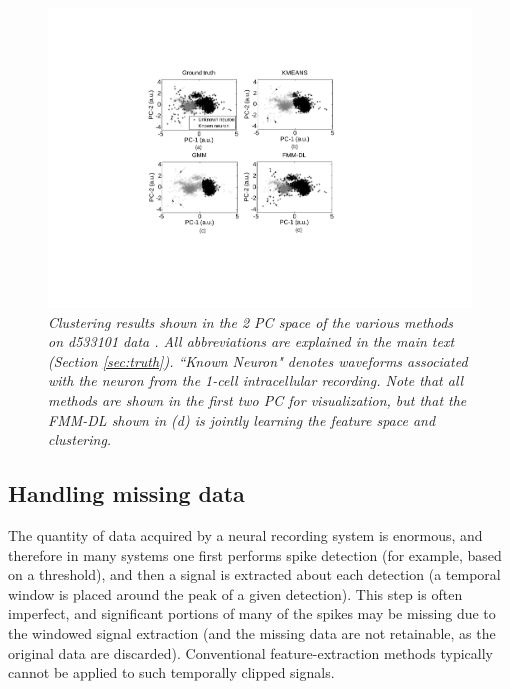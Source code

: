 \documentclass[journal]{IEEEtran}
\begin{document}
\begin{figure}[h!]
  \centering
    \includegraphics[width=1.0\linewidth]{figs_new/Dictionary_hc1.pdf}
    \caption{\textit{\small{ Clustering results shown in the 2 PC space of the various methods on d533101 data \cite{Henze2000}. All abbreviations are explained in the main text (Section \ref{sec:truth}). ``Known Neuron" denotes waveforms associated with the neuron from the 1-cell intracellular recording.   Note that all methods are shown in the first two PC for visualization, but that the FMM-DL shown in (d) is jointly learning the feature space and clustering.
}}}
\label{fig:Dictionary_hc_1}
\end{figure}

\subsection{Handling missing data} \label{sec:missing}

The quantity of data acquired by a neural recording system is enormous, and therefore in many systems one first performs spike detection (for example, based on a threshold), and then a signal is extracted about each detection (a temporal window is placed around the peak of a given detection). This step is often imperfect, and significant portions of many of the spikes may be missing due to the windowed signal extraction (and the missing data are not retainable, as the original data are discarded). Conventional feature-extraction methods typically cannot be applied to such temporally clipped signals.
\end{document}
